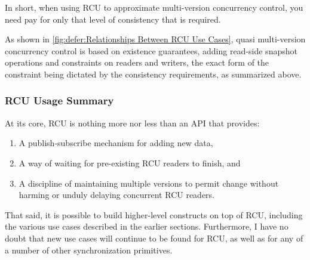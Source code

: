 In short, when using RCU to approximate multi-version concurrency
control, you need pay for only that level of consistency that is required.

As shown in \cref{fig:defer:Relationships Between RCU Use Cases},
quasi multi-version concurrency control is based on existence guarantees,
adding read-side snapshot operations and constraints on readers and
writers, the exact form of the constraint being dictated by the
consistency requirements, as summarized above.

\subsubsection{RCU Usage Summary}
\label{sec:defer:RCU Usage Summary}

At its core, RCU is nothing more nor less than an API that provides:

\begin{enumerate}
\item	A publish-subscribe mechanism for adding new data,
\item	A way of waiting for pre-existing RCU readers to finish, and
\item	A discipline of maintaining multiple versions to permit change
	without harming or unduly delaying concurrent RCU readers.
\end{enumerate}

That said, it is possible to build higher-level constructs on top of RCU,
including the various use cases described in the earlier sections.
Furthermore, I have no doubt that new use cases will continue to be
found for RCU, as well as for any of a number of other synchronization
primitives.

\QuickQuizEnd

